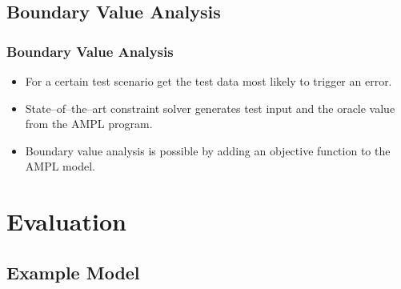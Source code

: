 \documentclass{beamer}
\begin{document}
\subsection{Boundary Value Analysis}
\begin{frame}
\frametitle{Boundary Value Analysis}
	\begin{itemize}
		\item For a certain test scenario get the test data most likely to trigger an error.
		\item State–of–the–art constraint solver generates test input and the oracle value from the AMPL program.
		\item Boundary value analysis is possible by adding an objective
function to the AMPL model.
	\end{itemize}
\end{frame}

\section{Evaluation}
\subsection{Example Model}
\end{document}
